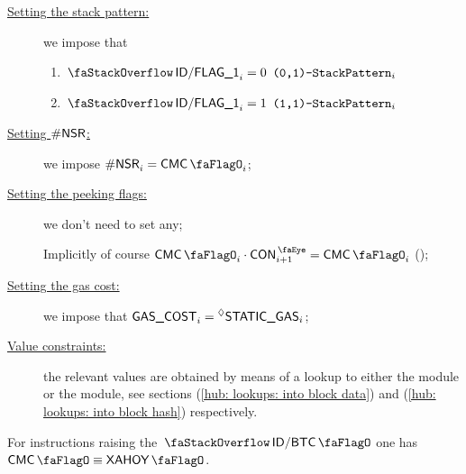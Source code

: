 \begin{center}
\end{center}
\begin{description}
	\item[\underline{Setting the stack pattern:}]
		we impose that
	\begin{enumerate}
		\item \If $\decFlag{1}_{i} = 0$ \Then $\texttt{(0,1)-}\texttt{StackPattern}_{i}$
		\item \If $\decFlag{1}_{i} = 1$ \Then $\texttt{(1,1)-}\texttt{StackPattern}_{i}$
	\end{enumerate}
	\item[\underline{Setting $\textsf{\#NSR}$:}]
		we impose $\nonStackRows_{i} = \cmc_{i}$;
	\item[\underline{Setting the peeking flags:}]
		we don't need to set any;

	\saNote{} Implicitly of course $\cmc_{i} \cdot \peekContext_{i + 1} = \cmc_{i}$ (\trash);
	\item[\underline{Setting the gas cost:}]
		we impose that $\textsf{GAS}\textsf{\_COST}_{i} = \prescript{\lozenge}{}{\textsf{STATIC\_GAS}}_{i}$;
	\item[\underline{Value constraints:}]
		the relevant values are obtained by means of a lookup to either the \btcMod{} module or the \blockHashMod{} module,
		see sections
		(\ref{hub: lookups: into block data}) and
		(\ref{hub: lookups: into block hash}) respectively.
\end{description}
\saNote{} For instructions raising the $\stackDecBtcFlag$ one has $\cmc \equiv \xAhoy$.
